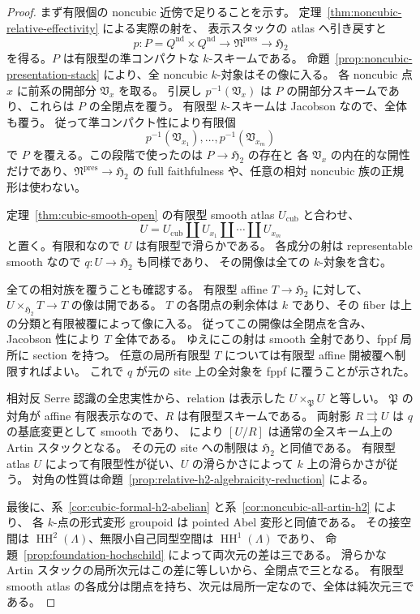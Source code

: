 \begin{proof}
まず有限個の noncubic 近傍で足りることを示す。
定理~\ref{thm:noncubic-relative-effectivity} による実際の射を、
表示スタックの atlas へ引き戻すと
\[
 p:P=Q^{\mathrm{nd}}\times Q^{\mathrm{nd}}
   \longrightarrow\mathfrak N^{\mathrm{pres}}
   \longrightarrow\mathfrak H_2
\]
を得る。$P$ は有限型の準コンパクトな $k$-スキームである。
命題~\ref{prop:noncubic-presentation-stack} により、全 noncubic $k$-対象はその像に入る。
各 noncubic 点 $x$ に前系の開部分 $\mathfrak V_x$ を取る。
引戻し $p^{-1}(\mathfrak V_x)$ は $P$ の開部分スキームであり、これらは $P$ の全閉点を覆う。
有限型 $k$-スキームは Jacobson なので、全体も覆う。
従って準コンパクト性により有限個
\[
 p^{-1}(\mathfrak V_{x_1}),\ldots,p^{-1}(\mathfrak V_{x_m})
\]
で $P$ を覆える。この段階で使ったのは $P\to\mathfrak H_2$ の存在と
各 $\mathfrak V_x$ の内在的な開性だけであり、$\mathfrak N^{\mathrm{pres}}\to\mathfrak H_2$
の full faithfulness や、任意の相対 noncubic 族の正規形は使わない。

定理~\ref{thm:cubic-smooth-open} の有限型 smooth atlas $U_{\mathrm{cub}}$ と合わせ、
\[
 U=U_{\mathrm{cub}}\amalg U_{x_1}\amalg\cdots\amalg U_{x_m}
\]
と置く。有限和なので $U$ は有限型で滑らかである。
各成分の射は representable smooth なので $q:U\to\mathfrak H_2$ も同様であり、
その開像は全ての $k$-対象を含む。

全ての相対族を覆うことも確認する。
有限型 affine $T\to\mathfrak H_2$ に対して、$U\times_{\mathfrak H_2}T\to T$ の像は開である。
$T$ の各閉点の剰余体は $k$ であり、その fiber は上の分類と有限被覆によって像に入る。
従ってこの開像は全閉点を含み、Jacobson 性により $T$ 全体である。
ゆえにこの射は smooth 全射であり、fppf 局所に section を持つ。
任意の局所有限型 $T$ については有限型 affine 開被覆へ制限すればよい。
これで $q$ が元の site 上の全対象を fppf に覆うことが示された。

相対反 Serre 認識の全忠実性から、relation は表示した $U\times_{\mathfrak P}U$ と等しい。
$\mathfrak P$ の対角が affine 有限表示なので、$R$ は有限型スキームである。
両射影 $R\rightrightarrows U$ は $q$ の基底変更として smooth であり、
\cite[Tags 04X0, 04TK]{StacksSmoothAtlas} により $[U/R]$ は通常の全スキーム上の Artin スタックとなる。
その元の site への制限は $\mathfrak H_2$ と同値である。
有限型 atlas $U$ によって有限型性が従い、$U$ の滑らかさによって $k$ 上の滑らかさが従う。
対角の性質は命題~\ref{prop:relative-h2-algebraicity-reduction} による。

最後に、系~\ref{cor:cubic-formal-h2-abelian} と系~\ref{cor:noncubic-all-artin-h2} により、
各 $k$-点の形式変形 groupoid は pointed Abel 変形と同値である。
その接空間は $\operatorname{HH}^2(\Lambda)$、無限小自己同型空間は
$\operatorname{HH}^1(\Lambda)$ であり、
命題~\ref{prop:foundation-hochschild} によって両次元の差は三である。
滑らかな Artin スタックの局所次元はこの差に等しいから、全閉点で三となる。
有限型 smooth atlas の各成分は閉点を持ち、次元は局所一定なので、全体は純次元三である。
\end{proof}

